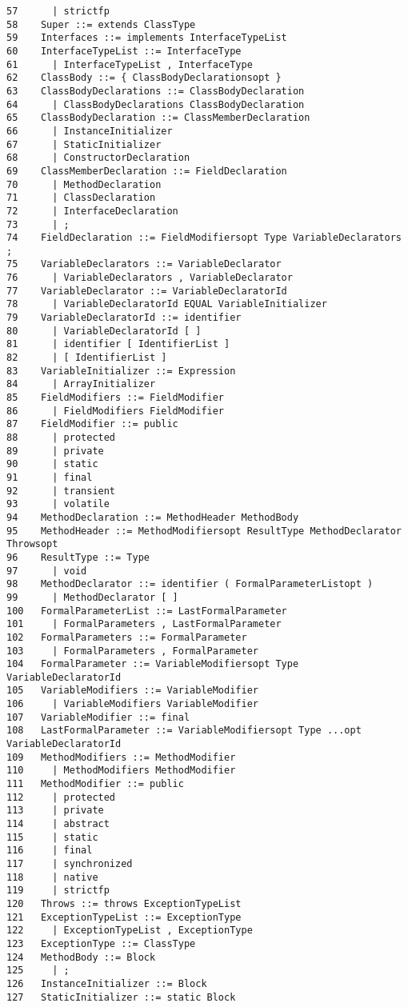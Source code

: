 {\begin{verbatim}
57      | strictfp
58    Super ::= extends ClassType
59    Interfaces ::= implements InterfaceTypeList
60    InterfaceTypeList ::= InterfaceType
61      | InterfaceTypeList , InterfaceType
62    ClassBody ::= { ClassBodyDeclarationsopt }
63    ClassBodyDeclarations ::= ClassBodyDeclaration
64      | ClassBodyDeclarations ClassBodyDeclaration
65    ClassBodyDeclaration ::= ClassMemberDeclaration
66      | InstanceInitializer
67      | StaticInitializer
68      | ConstructorDeclaration
69    ClassMemberDeclaration ::= FieldDeclaration
70      | MethodDeclaration
71      | ClassDeclaration
72      | InterfaceDeclaration
73      | ;
74    FieldDeclaration ::= FieldModifiersopt Type VariableDeclarators ;
75    VariableDeclarators ::= VariableDeclarator
76      | VariableDeclarators , VariableDeclarator
77    VariableDeclarator ::= VariableDeclaratorId
78      | VariableDeclaratorId EQUAL VariableInitializer
79    VariableDeclaratorId ::= identifier
80      | VariableDeclaratorId [ ]
81      | identifier [ IdentifierList ]
82      | [ IdentifierList ]
83    VariableInitializer ::= Expression
84      | ArrayInitializer
85    FieldModifiers ::= FieldModifier
86      | FieldModifiers FieldModifier
87    FieldModifier ::= public
88      | protected
89      | private
90      | static
91      | final
92      | transient
93      | volatile
94    MethodDeclaration ::= MethodHeader MethodBody
95    MethodHeader ::= MethodModifiersopt ResultType MethodDeclarator Throwsopt
96    ResultType ::= Type
97      | void
98    MethodDeclarator ::= identifier ( FormalParameterListopt )
99      | MethodDeclarator [ ]
100   FormalParameterList ::= LastFormalParameter
101     | FormalParameters , LastFormalParameter
102   FormalParameters ::= FormalParameter
103     | FormalParameters , FormalParameter
104   FormalParameter ::= VariableModifiersopt Type VariableDeclaratorId
105   VariableModifiers ::= VariableModifier
106     | VariableModifiers VariableModifier
107   VariableModifier ::= final
108   LastFormalParameter ::= VariableModifiersopt Type ...opt VariableDeclaratorId
109   MethodModifiers ::= MethodModifier
110     | MethodModifiers MethodModifier
111   MethodModifier ::= public
112     | protected
113     | private
114     | abstract
115     | static
116     | final
117     | synchronized
118     | native
119     | strictfp
120   Throws ::= throws ExceptionTypeList
121   ExceptionTypeList ::= ExceptionType
122     | ExceptionTypeList , ExceptionType
123   ExceptionType ::= ClassType
124   MethodBody ::= Block
125     | ;
126   InstanceInitializer ::= Block
127   StaticInitializer ::= static Block

\end{verbatim}}
